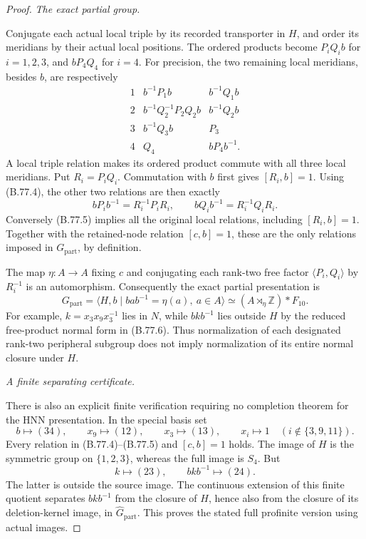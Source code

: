 \begin{proof}
\emph{The exact partial group.}\par
Conjugate each actual local triple by its recorded transporter in
\(H\), and order its meridians by their actual local positions.
The ordered products become \(P_iQ_i b\) for \(i=1,2,3\),
and \(bP_4Q_4\) for \(i=4\). For precision, the two remaining
local meridians, besides \(b\), are respectively
\[
\begin{array}{c|c|c}
1&b^{-1}P_1b&b^{-1}Q_1b\\
2&b^{-1}Q_2^{-1}P_2Q_2b&b^{-1}Q_2b\\
3&b^{-1}Q_3b&P_3\\
4&Q_4&bP_4b^{-1}.
\end{array}
 \tag{B.77.4}
\]
A local triple relation makes its ordered product commute with
all three local meridians. Put \(R_i=P_iQ_i\). Commutation with
\(b\) first gives \([R_i,b]=1\). Using (B.77.4), the other two
relations are then exactly
\[
 bP_ib^{-1}=R_i^{-1}P_iR_i,
 \qquad bQ_ib^{-1}=R_i^{-1}Q_iR_i.
 \tag{B.77.5}
\]
Conversely (B.77.5) implies all the original local relations,
including \([R_i,b]=1\). Together with the retained-node
relation \([c,b]=1\), these are the only relations imposed in
\(G_{\mathrm{part}}\), by definition.

The map \(\eta:A\to A\) fixing \(c\) and conjugating each
rank-two free factor \(\langle P_i,Q_i\rangle\) by
\(R_i^{-1}\) is an automorphism. Consequently the exact partial
presentation is
\[
 G_{\mathrm{part}}
 =\langle H,b\mid bab^{-1}=\eta(a),\ a\in A\rangle
 \simeq(A\rtimes_{\eta}\mathbb Z)*F_{10}.
 \tag{B.77.6}
\]
For example, \(k=x_3x_9x_3^{-1}\) lies in \(N\), while
\(bkb^{-1}\) lies outside \(H\) by the reduced free-product
normal form in (B.77.6). Thus normalization of each designated
rank-two peripheral subgroup does not imply normalization of
its entire normal closure under \(H\).

\emph{A finite separating certificate.}\par
There is also an explicit finite verification requiring no
completion theorem for the HNN presentation. In the special basis set
\[
 b\longmapsto(34),\qquad x_9\longmapsto(12),\qquad
 x_3\longmapsto(13),\qquad x_i\longmapsto1
 \quad(i\notin\{3,9,11\}).
 \tag{B.77.7}
\]
Every relation in (B.77.4)--(B.77.5) and \([c,b]=1\) holds.
The image of \(H\) is the symmetric group on
\(\{1,2,3\}\), whereas the full image is \(S_4\). But
\[
             k\longmapsto(23),\qquad
             bkb^{-1}\longmapsto(24).
 \tag{B.77.8}
\]
The latter is outside the source image. The continuous extension
of this finite quotient separates \(bkb^{-1}\) from the closure
of \(H\), hence also from the closure of its deletion-kernel
image, in \(\widehat{G}_{\mathrm{part}}\). This proves the
stated full profinite version using actual images.


\end{proof}
